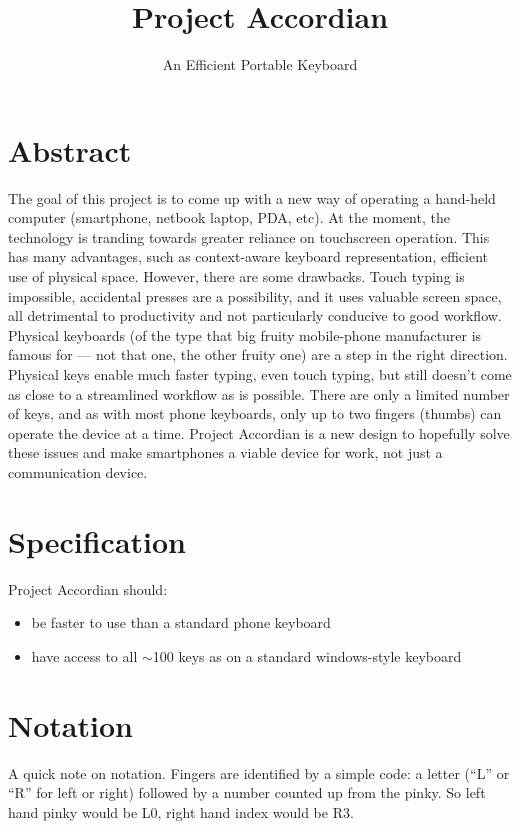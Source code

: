 \documentclass{article}
\title{Project Accordian}
\author{An Efficient Portable Keyboard}
\date{ }
\begin{document}
\maketitle

\section{Abstract}
The goal of this project is to come up with a new way of operating a hand-held computer (smartphone, netbook laptop, PDA, etc). At the moment, the technology is tranding towards greater reliance on touchscreen operation. This has many advantages, such as context-aware keyboard representation, efficient use of physical space. However, there are some drawbacks. Touch typing is impossible, accidental presses are a possibility, and it uses valuable screen space, all detrimental to productivity and not particularly conducive to good workflow. Physical keyboards (of the type that big fruity mobile-phone manufacturer is famous for --- not that one, the other fruity one) are a step in the right direction. Physical keys enable much faster typing, even touch typing, but still doesn't come as close to a streamlined workflow as is possible. There are only a limited number of keys, and as with most phone keyboards, only up to two fingers (thumbs) can operate the device at a time. Project Accordian is a new design to hopefully solve these issues and make smartphones a viable device for work, not just a communication device.

\section{Specification}
Project Accordian should:
\begin{itemize}
\item be faster to use than a standard phone keyboard
\item have access to all $\sim$100 keys as on a standard windows-style keyboard
\end{itemize}

\section{Notation}
A quick note on notation. Fingers are identified by a simple code: a letter (``L'' or ``R'' for left or right) followed by a number counted up from the pinky. So left hand pinky would be L0, right hand index would be R3.
\end{document}
